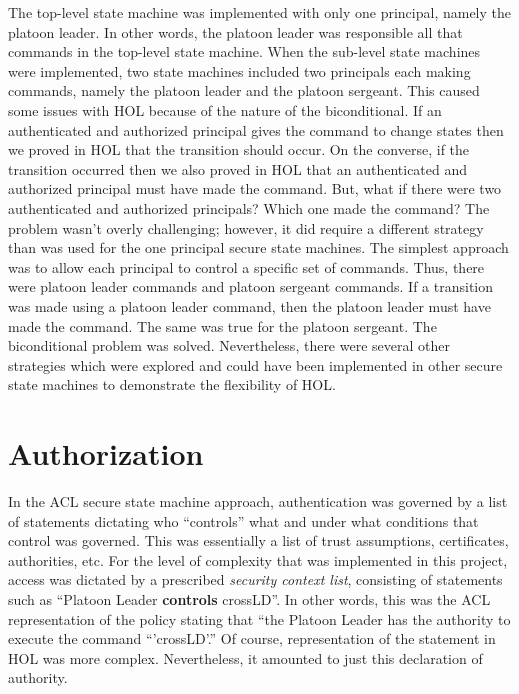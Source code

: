 The top-level state machine was implemented with only one principal, namely the
platoon leader. In other words, the platoon leader was responsible all that commands
in the top-level state machine. When the sub-level state machines were implemented,
two state machines included two principals each making commands, namely the platoon
leader and the platoon sergeant. This caused some issues with HOL because of the
nature of the biconditional. If an authenticated and authorized principal gives the
command to change states then we proved in HOL that the transition should occur.
On the converse, if the transition occurred then we also proved in HOL that an
authenticated and authorized principal must have made the command. But, what if there
were two authenticated and authorized principals? Which one made the command? The
problem wasn’t overly challenging; however, it did require a different strategy than
was used for the one principal secure state machines. The simplest approach was to
allow each principal to control a specific set of commands. Thus, there were platoon
leader commands and platoon sergeant commands. If a transition was made using a platoon
leader command, then the platoon leader must have made the command. The same was true
for the platoon sergeant. The biconditional problem was solved. Nevertheless, there
were several other strategies which were explored and could have been implemented in
other secure state machines to demonstrate the flexibility of HOL.


\section{Authorization}
\label{sec:authorization-1}

In the ACL secure state machine approach, authentication was governed by a list of
statements dictating who “controls” what and under what conditions that control was
governed. This was essentially a list of trust assumptions, certificates, authorities,
etc. For the level of complexity that was implemented in this project, access was
dictated by a prescribed \textit{security context list}, consisting of statements such as
“Platoon Leader \textbf{controls} crossLD”. In other words, this was the ACL representation
of the policy stating that “the Platoon Leader has the authority to execute the
command “’crossLD’.” Of course, representation of the statement in HOL was more complex.
Nevertheless, it amounted to just this declaration of authority.\\

